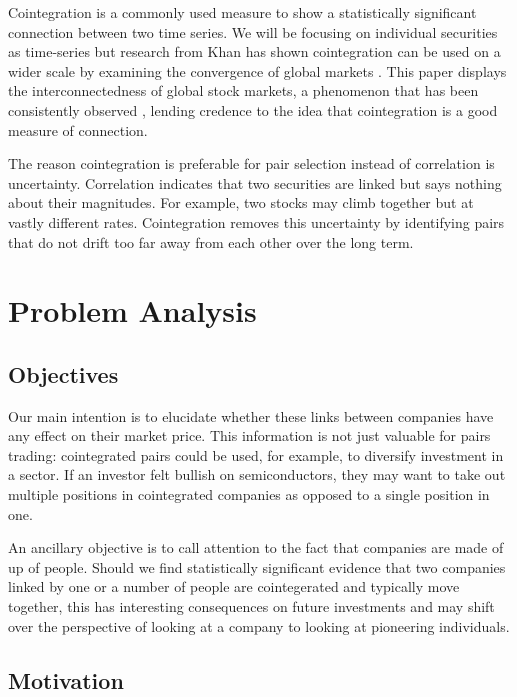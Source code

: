 \documentclass{UoYCSproject}
\begin{document}
Cointegration is a commonly used measure to show a statistically significant connection between two time series. We will be focusing on individual securities as time-series but research from Khan has shown cointegration can be used on a wider scale by examining the convergence of global markets \parencite{khancointegration}. This paper displays the interconnectedness of global stock markets, a phenomenon that has been consistently observed \parencite{interconnectedness} \parencite{topical} \parencite{global}, lending credence to the idea that cointegration is a good measure of connection.

The reason cointegration is preferable for pair selection instead of correlation is uncertainty. Correlation indicates that two securities are linked but says nothing about their magnitudes. For example, two stocks may climb together but at vastly different rates. Cointegration removes this uncertainty by identifying pairs that do not drift too far away from each other over the long term.

\chapter{Problem Analysis}
\label{cha:Problem Analysis}

\section{Objectives}

Our main intention is to elucidate whether these links between companies have any effect on their market price. This information is not just valuable for pairs trading: cointegrated pairs could be used, for example, to diversify investment in a sector. If an investor felt bullish on semiconductors, they may want to take out multiple positions in cointegrated companies as opposed to a single position in one.

An ancillary objective is to call attention to the fact that companies are made of up of people. Should we find statistically significant evidence that two companies linked by one or a number of people are cointegerated and typically move together, this has interesting consequences on future investments and may shift over the perspective of looking at a company to looking at pioneering individuals. 

\section{Motivation}
\end{document}
